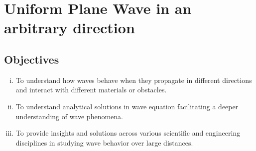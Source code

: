 \chapter{Uniform Plane Wave in an arbitrary direction}\label{lec:lec29}

\begin{mdframed}[backgroundcolor=lightblue, linewidth=1pt,  hidealllines=true]
\section{Objectives}
\begin{enumerate}[(i)]
\item To understand how waves behave when they propagate in different directions and interact with different materials or obstacles.
\item To understand analytical solutions in wave equation facilitating a deeper understanding of wave phenomena.
\item To provide insights and solutions across various scientific and engineering disciplines in studying wave behavior over large distances.
\end{enumerate}
\end{mdframed}
